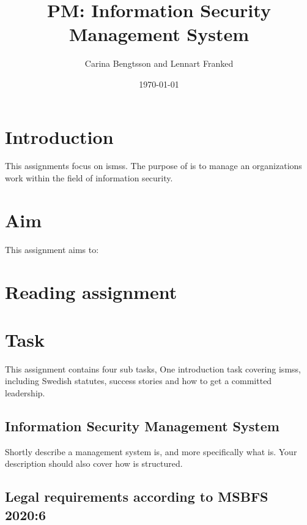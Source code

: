 \documentclass[a4paper]{article}
\begin{document}
\title{PM\@: Information Security Management System}
\author{%
  Carina Bengtsson and Lennart Franked
}
\date{\today}

\maketitle


\section{Introduction}
\label{sec:introduction}

This assignments focus on \acp{isms}. The purpose of  is to manage
an organizations work within the field of information security.

\section{Aim}
\label{sec:aim}

This assignment aims to:
\begin{itemize}
  
\end{itemize}


\section{Reading assignment}




\section{Task}\label{Work}

This assignment contains four sub tasks, One introduction task covering
\acp{isms}, including Swedish statutes, success stories and how to get a
committed leadership.

\subsection{Information Security Management System}
Shortly describe a management system is, and more specifically what  
is. Your description should also cover how  is
structured.

\subsection{Legal requirements according to MSBFS 2020:6}
\end{document}
